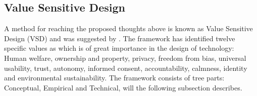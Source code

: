 
\subsection{Value Sensitive Design}
\label{subsec:vsd_framework}
A method for reaching the proposed thoughts above is known as Value Sensitive Design (VSD) and was suggested by \citet{HumanValuesEthicsAndDesign}. The framework has identified twelve specific values as which is of great importance in the design of technology: Human welfare, ownership and property, privacy, freedom from bias, universal usability, trust, autonomy, informed consent, accountability, calmness, identity and environmental sustainability. The framework consists of tree parts: Conceptual, Empirical and Technical, will the following subsection describes. 

